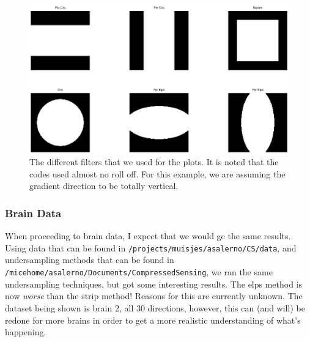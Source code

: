 \documentclass[11 pt]{article}
\begin{document}
  \begin{figure}[!h]
      \centering
      \vspace{0pt}
      \setlength\fboxsep{0pt}
      \setlength\fboxrule{0.5pt}
      \includegraphics[trim = {10mm 0mm 10mm 0mm},clip,scale = 0.4] {Figs/numericalSims/DiffFilts.eps}
      \caption{The different filters that we used for the plots. It is noted that the codes used almost no roll off. For this example, we are assuming the gradient direction to be totally vertical.}
      \label{fig:USFilts}

  \end{figure}
    
    \newpage
    \subsubsection{Brain Data}
    
    When proceeding to brain data, I expect that we would ge the same results. Using data that can be found in \verb!/projects/muisjes/asalerno/CS/data!, and undersampling methods that can be found in \verb!/micehome/asalerno/Documents/CompressedSensing!, we ran the same undersampling techniques, but got some interesting results. The elps method is now \emph{worse} than the strip method! Reasons for this are currently unknown. The dataset being shown is brain 2, all 30 directions, however, this can (and will) be redone for more brains in order to get a more realistic understanding of what's happening.
    
\end{document}

